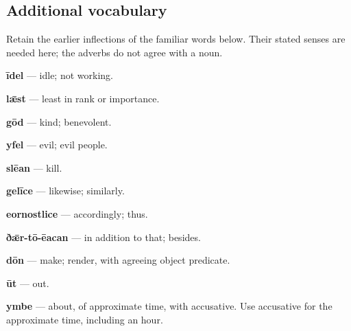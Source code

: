 \subsection*{Additional vocabulary}

Retain the earlier inflections of the familiar words below. Their stated senses are needed here; the adverbs do not agree with a noun.

\textbf{īdel} — idle; not working.

\textbf{lǣst} — least in rank or importance.

\textbf{gōd} — kind; benevolent.

\textbf{yfel} — evil; evil people.

\textbf{slēan} — kill.

\textbf{gelīce} — likewise; similarly.

\textbf{eornostlice} — accordingly; thus.

\textbf{ðǣr-tō-ēacan} — in addition to that; besides.

\textbf{dōn} — make; render, with agreeing object predicate.

\textbf{ūt} — out.

\textbf{ymbe} — about, of approximate time, with accusative. Use accusative for the approximate time, including an hour.

